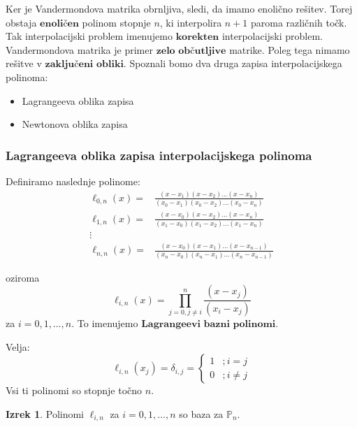 \documentclass[a4paper,12pt]{article}
\theoremstyle{definition}
\newtheorem{theorem}[counter]{Izrek}
\theoremstyle{remark}
\newcommand{\Pp}{\mathbb{P}}
\begin{document}
Ker je Vandermondova matrika obrnljiva, sledi, da imamo enolično rešitev. Torej obstaja $\textbf{enoličen}$ polinom stopnje $n$, ki interpolira $n+1$ paroma
različnih točk.
Tak interpolacijski problem imenujemo $\textbf{korekten}$ interpolacijski problem.
Vandermondova matrika je primer $\textbf{zelo občutljive}$ matrike.
Poleg tega nimamo rešitve v $\textbf{zaključeni obliki}$.
Spoznali bomo dva druga zapisa interpolacijskega polinoma:
\begin{itemize}
    \item Lagrangeeva oblika zapisa
    \item Newtonova oblika zapisa
\end{itemize}

\subsubsection{Lagrangeeva oblika zapisa interpolacijskega polinoma}
Definiramo naslednje polinome:
\begin{align*}
    \ell_{0, n} (x) =& \frac{(x-x_1)(x-x_2) \dots (x - x_n)}{(x_0 - x_1)(x_0 - x_2) \dots (x_0 - x_n)} \\
    \ell_{1, n} (x) =& \frac{(x-x_0)(x-x_2) \dots (x - x_n)}{(x_1 - x_0)(x_1 - x_2) \dots (x_1 - x_n)} \\
    \vdots &\\
    \ell_{n, n} (x) =& \frac{(x-x_0)(x-x_1) \dots (x - x_{n-1})}{(x_n - x_0)(x_n - x_1) \dots (x_n - x_{n-1})}
\end{align*}

oziroma
\begin{equation*}
    \ell_{i, n} (x) = \prod_{j = 0, j \neq i}^{n} \frac{(x - x_j)}{(x_i - x_j)}
\end{equation*}
za $i = 0, 1, \dots, n$. To imenujemo $\textbf{Lagrangeevi bazni polinomi}$.

Velja:
\begin{equation*}
    \ell_{i, n} (x_j) = \delta_{i, j} = \begin{cases}
        1 &; i = j \\
        0 &; i \neq j
    \end{cases}
\end{equation*}
Vsi ti polinomi so stopnje točno $n$.

\begin{theorem}
    Polinomi $\ell_{i, n}$ za $i = 0, 1, \dots, n$ so baza za $\Pp_n$.
\end{theorem}
\end{document}
